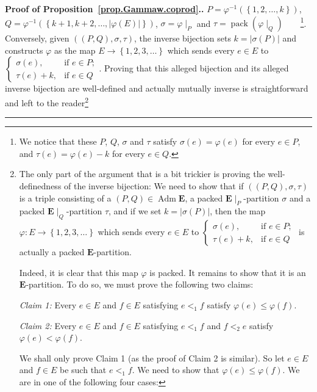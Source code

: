 \documentclass[numbers=enddot,12pt,final,onecolumn,notitlepage,abstracton]{scrartcl}%
\theoremstyle{definition}
\newenvironment{proof}[1][Proof]{\noindent\textbf{#1.} }{\ \rule{0.5em}{0.5em}}
\newcommand{\Adm}{\operatorname{Adm}}
\newcommand{\pack}{\operatorname{pack}}
\newcommand{\EE}{{\mathbf{E}}}
\begin{document}
\begin{proof}[Proof of Proposition~\ref{prop.Gammaw.coprod}.]
$P = \varphi^{-1}\left(\left\{1, 2, \ldots, k\right\}\right)$,
$Q = \varphi^{-1}\left(\left\{k+1, k+2, \ldots, \left|\varphi\left(E\right)\right|\right\}\right)$,
$\sigma = \varphi\mid_P$ and
$\tau = \pack \left(\varphi\mid_Q\right)$\ \ \ \ \footnote{We
notice that these $P$, $Q$, $\sigma$ and $\tau$ satisfy
$\sigma\left(e\right) = \varphi\left(e\right)$ for every
$e \in P$, and $\tau\left(e\right) = \varphi\left(e\right) - k$
for every $e \in Q$.}. Conversely, given
$\left(\left(P, Q\right), \sigma, \tau\right)$,
the inverse bijection
sets $k = \left|\sigma\left(P\right)\right|$ and constructs
$\varphi$ as the map $E \to \left\{1, 2, 3, \ldots\right\}$
which sends every $e \in E$ to
$\begin{cases} \sigma\left(e\right), &\mbox{if } e \in P; \\
\tau\left(e\right) + k, &\mbox{if } e \in Q \end{cases}$.
Proving that this alleged bijection and its alleged inverse
bijection are well-defined and actually mutually inverse is
straightforward and left to the reader\footnote{The only
part of the argument that is a bit trickier is proving the
well-definedness of the inverse bijection: We need to show
that if $\left(\left(P, Q\right), \sigma, \tau
\right)$ is a triple consisting of a
$\left(P, Q\right) \in \Adm \EE$, a packed
$\EE\mid_P$-partition $\sigma$ and a packed $\EE\mid_Q$-partition
$\tau$, and if we set $k = \left|\sigma\left(P\right)\right|$,
then the map $\varphi : E \to \left\{1, 2, 3, \ldots\right\}$
which sends every $e \in E$ to
$\begin{cases} \sigma\left(e\right), &\mbox{if } e \in P; \\
\tau\left(e\right) + k, &\mbox{if } e \in Q \end{cases}$
is actually a packed $\EE$-partition.

Indeed, it is clear that this map $\varphi$ is packed. It remains
to show that it is an $\EE$-partition. To do so, we must prove
the following two claims:

\textit{Claim 1:} Every $e \in E$ and $f \in E$ satisfying
$e <_1 f$ satisfy
$\varphi\left(e\right) \leq \varphi\left(f\right)$.

\textit{Claim 2:} Every $e \in E$ and $f \in E$ satisfying
$e <_1 f$ and $f <_2 e$ satisfy
$\varphi\left(e\right) < \varphi\left(f\right)$.

We shall only prove Claim 1 (as the proof of Claim 2 is
similar). So let $e \in E$ and $f \in E$ be such that
$e <_1 f$. We need to show that
$\varphi\left(e\right) \leq \varphi\left(f\right)$.
We are in one of the following four cases:

}
\end{proof}
\end{document}
